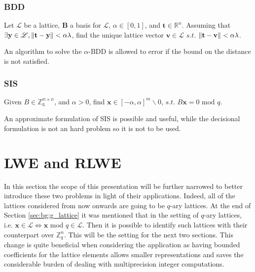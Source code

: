\subsubsection{BDD}

\begin{definition}
Let $\mathscr{L}$ be a lattice, $\mathbf{B}$ a basis for $\mathscr{L}$, $\alpha\in[0,1]$, and $\mathbf{t}\in\mathbb{R}^n$. Assuming that $\exists \mathbf{y}\in\mathscr{L},\left\lVert \mathbf{t}-\mathbf{y} \right\rVert < \alpha\lambda$, find the unique lattice vector $\mathbf{v}\in\mathscr{L}$ $s.t.$ $\left\lVert \mathbf{t}-\mathbf{v} \right\rVert<\alpha\lambda$.
\end{definition}

\begin{remark}
An algorithm to solve the $\alpha$-BDD is allowed to error if the bound on the distance is not satisfied.
\end{remark}

\subsubsection{SIS}

\begin{definition}
Given $B\in\mathbb{Z_q^{m\times n}}$, and $\alpha > 0$, find $\mathbf{x}\in[-\alpha,\alpha]^m\backslash{0}$, $s.t.$ $B\mathbf{x}=0$ $\mathrm{mod}$ $q$.
\end{definition}

\begin{remark}
An approximate formulation of SIS is possible and useful, while the decisional formulation is not an hard problem so it is not to be used.
\end{remark}

\section{LWE and RLWE}
In this section the scope of this presentation will be further narrowed to better introduce these two problems in light of their applications. Indeed, all of the lattices considered from now onwards are going to be $q$-ary lattices. At the end of Section \ref{sec:bg:g_lattice} it was mentioned that in the setting of $q$-ary lattices, i.e. $\mathbf{x}\in\mathscr{L}\Leftrightarrow\mathbf{x}$ $\mathrm{mod}$ $q\in\mathscr{L}$. Then it is possible to identify such lattices with their counterpart over $\mathbb{Z}_q^n$. This will be the setting for the next two sections. This change is quite beneficial when considering the application as having bounded coefficients for the lattice elements allows smaller representations and saves the considerable burden of dealing with  multiprecision integer computations. \\

